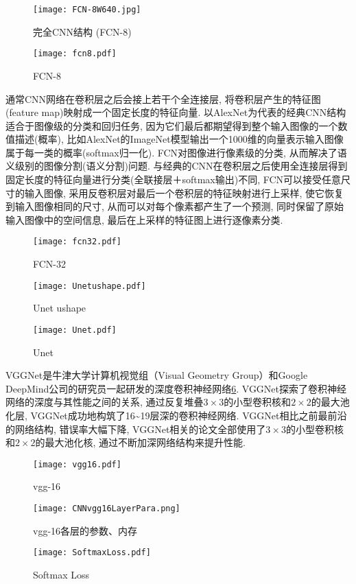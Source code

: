 \begin{figure}[H]
\centering
\texttt{[image: FCN-8W640.jpg]}
\caption{完全CNN结构 (FCN-8)\cite{PiramanayagamSaber2018-9591}}
\label{FCN-8W640}
\end{figure}
\begin{figure}[H]
\centering
\texttt{[image: fcn8.pdf]}
\caption{FCN-8}
\label{CNNfcn80203}
\end{figure}
通常CNN网络在卷积层之后会接上若干个全连接层, 将卷积层产生的特征图(feature map)映射成一个固定长度的特征向量. 以AlexNet为代表的经典CNN结构适合于图像级的分类和回归任务, 因为它们最后都期望得到整个输入图像的一个数值描述(概率), 比如AlexNet的ImageNet模型输出一个1000维的向量表示输入图像属于每一类的概率(softmax归一化). FCN对图像进行像素级的分类, 从而解决了语义级别的图像分割(语义分割)问题. 与经典的CNN在卷积层之后使用全连接层得到固定长度的特征向量进行分类(全联接层＋softmax输出)不同, FCN可以接受任意尺寸的输入图像, 采用反卷积层对最后一个卷积层的特征映射进行上采样, 使它恢复到输入图像相同的尺寸, 从而可以对每个像素都产生了一个预测, 同时保留了原始输入图像中的空间信息, 最后在上采样的特征图上进行逐像素分类.
\begin{figure}[H]
\centering
\texttt{[image: fcn32.pdf]}
\caption{FCN-32}
\label{CNNfcn320203}
\end{figure}
\begin{figure}[H]
\centering
\texttt{[image: Unetushape.pdf]}
\caption{Unet ushape}
\label{CNNUnetushape0203}
\end{figure}
\begin{figure}[H]
\centering
\texttt{[image: Unet.pdf]}
\caption{Unet}
\label{CNNUnet0203}
\end{figure}
VGGNet是牛津大学计算机视觉组（Visual Geometry Group）和Google DeepMind公司的研究员一起研发的深度卷积神经网络\ref{CNNvgg16020301}.
VGGNet探索了卷积神经网络的深度与其性能之间的关系, 通过反复堆叠$3\times 3$的小型卷积核和$2\times 2$的最大池化层,
VGGNet成功地构筑了16\textasciitilde 19层深的卷积神经网络. VGGNet相比之前最前沿的网络结构, 错误率大幅下降,
VGGNet相关的论文全部使用了$3\times 3$的小型卷积核和$2\times 2$的最大池化核, 通过不断加深网络结构来提升性能.
\begin{figure}[H]
\centering
\texttt{[image: vgg16.pdf]}
\caption{vgg-16}
\label{CNNvgg16020301}
\end{figure}
\begin{figure}[H]
\centering
\texttt{[image: CNNvgg16LayerPara.png]}
\caption{vgg-16各层的参数、内存}
\label{CNNvgg16LayerPara020302}
\end{figure}
\begin{figure}[H]
\centering
\texttt{[image: SoftmaxLoss.pdf]}
\caption{Softmax Loss}
\label{CNNSoftmaxLoss0203}
\end{figure}

